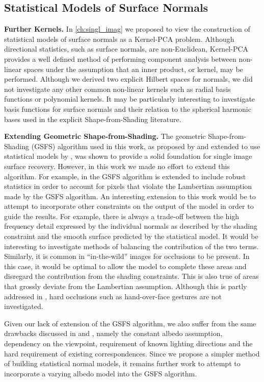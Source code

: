 \subsection{Statistical Models of Surface Normals}
\textbf{Further Kernels.} In \cref{ch:singl_imag} we proposed to view the
construction of statistical models of surface normals as a Kernel-PCA problem.
Although directional statistics, such as surface normals, are non-Euclidean,
Kernel-PCA provides a well defined method of performing component analysis
between non-linear spaces under the assumption that an inner product, or kernel,
may be performed. Although we derived two explicit Hilbert spaces for normals,
we did not investigate any other common non-linear kernels such as radial
basis functions or polynomial kernels. It may be particularly interesting
to investigate basis functions for surface normals and their relation to
the spherical harmonic bases used in the explicit Shape-from-Shading
literature.

\textbf{Extending Geometric Shape-from-Shading.}
The geometric Shape-from-Shading (GSFS) algorithm used in this work, as proposed
by \citet{worthington1999new} and extended to use statistical models by
\citet{smith2010estimating}, was shown to provide a solid foundation for
single image surface recovery. However, in this work we made no effort to extend
this algorithm. For example, in \citet{smith2008facial} the GSFS algorithm
is extended to include robust statistics in order to account for pixels
that violate the Lambertian assumption made by the GSFS algorithm. An interesting
extension to this work would be to attempt to incorporate other constraints on
the output of the model in order to guide the results. For example, there is
always a trade-off between the high frequency detail expressed by the individual
normals as described by the shading constraint and the smooth surface predicted
by the statistical model. It would be interesting to investigate methods
of balancing the contribution of the two terms. Similarly, it is common in
``in-the-wild'' images for occlusions to be present. In this case, it would be
optimal to allow the model to complete these areas and disregard the contribution
from the shading constraints. This is also true of areas that grossly deviate
from the Lambertian assumption. Although this is partly addressed in
\citet{smith2008facial}, hard occlusions such as hand-over-face gestures
are not investigated.

Given our lack of extension of the GSFS algorithm, we also suffer from the
same drawbacks discussed in \citet{smith2010estimating} and
\citet{smith2008facial}, namely the constant albedo assumption, dependency
on the viewpoint, requirement of known lighting directions and the
hard requirement of existing correspondences. Since
we propose a simpler method of building statistical normal models, it remains
further work to attempt to incorporate a varying albedo model into the GSFS
algorithm.

